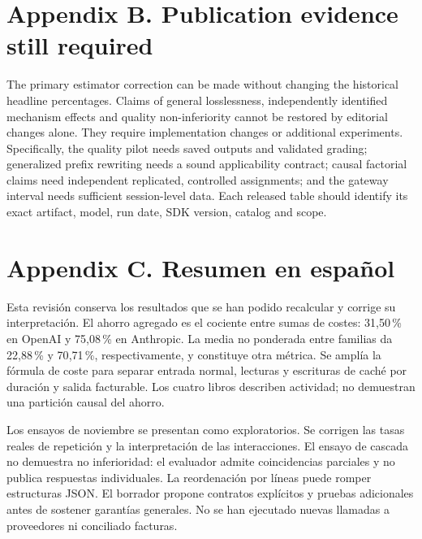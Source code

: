 \documentclass[11pt,a4paper]{article}
\begin{document}
\section*{Appendix B. Publication evidence still required}
The primary estimator correction can be made without changing the historical headline
percentages. Claims of general losslessness, independently identified mechanism effects and
quality non-inferiority cannot be restored by editorial changes alone. They require
implementation changes or additional experiments. Specifically, the quality pilot needs saved
outputs and validated grading; generalized prefix rewriting needs a sound applicability contract;
causal factorial claims need independent replicated, controlled assignments; and the gateway
interval needs sufficient session-level data. Each released table should identify its exact
artifact, model, run date, SDK version, catalog and scope.

\section*{Appendix C. Resumen en español}
Esta revisión conserva los resultados que se han podido recalcular y corrige su interpretación.
El ahorro agregado es el cociente entre sumas de costes: 31{,}50\,\% en OpenAI y 75{,}08\,\% en
Anthropic. La media no ponderada entre familias da 22{,}88\,\% y 70{,}71\,\%,
respectivamente, y constituye otra métrica. Se amplía la fórmula de coste para separar entrada
normal, lecturas y escrituras de caché por duración y salida facturable. Los cuatro libros
describen actividad; no demuestran una partición causal del ahorro.

Los ensayos de noviembre se presentan como exploratorios. Se corrigen las tasas reales de
repetición y la interpretación de las interacciones. El ensayo de cascada no demuestra no
inferioridad: el evaluador admite coincidencias parciales y no publica respuestas individuales.
La reordenación por líneas puede romper estructuras JSON. El borrador propone contratos
explícitos y pruebas adicionales antes de sostener garantías generales. No se han ejecutado
nuevas llamadas a proveedores ni conciliado facturas.
\end{document}
